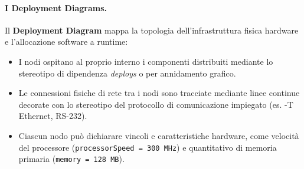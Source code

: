 \documentclass[12pt]{extarticle}
\begin{document}
\paragraph{I Deployment Diagrams.}
Il \textbf{Deployment Diagram} mappa la topologia dell'infrastruttura fisica hardware e l'allocazione software a runtime:
\begin{itemize}
    \item I nodi ospitano al proprio interno i componenti distribuiti mediante lo stereotipo di dipendenza \guillemotleft\textit{deploys}\guillemotright{} o per annidamento grafico.
    \item Le connessioni fisiche di rete tra i nodi sono tracciate mediante linee continue decorate con lo stereotipo del protocollo di comunicazione impiegato (es. -T Ethernet\guillemotright, \guillemotleft RS-232\guillemotright).
    \item Ciascun nodo può dichiarare vincoli e caratteristiche hardware, come velocità del processore (\texttt{processorSpeed = 300 MHz}) e quantitativo di memoria primaria (\texttt{memory = 128 MB}).
\end{itemize}
\end{document}
